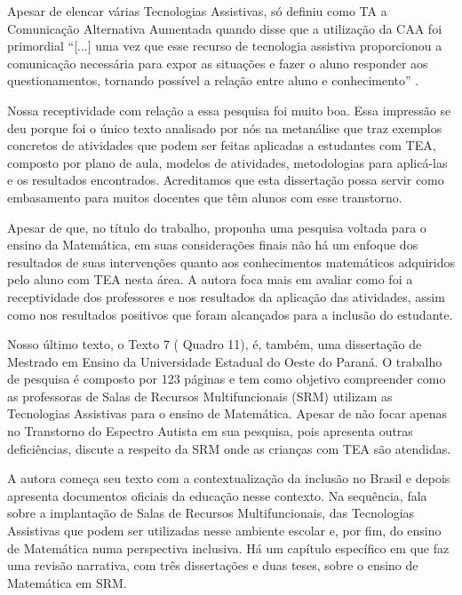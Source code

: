 \documentclass[portuguese]{textolivre}
\begin{document}
Apesar de elencar várias Tecnologias Assistivas, \textcite{camargo2020} só
definiu como TA a Comunicação Alternativa Aumentada quando disse que a
utilização da CAA foi primordial ``{[}...{]} uma vez que esse recurso de
tecnologia assistiva proporcionou a comunicação necessária para expor as
situações e fazer o aluno responder aos questionamentos, tornando
possível a relação entre aluno e conhecimento''
\cite[p.~80]{camargo2020}.

Nossa receptividade com relação a essa pesquisa foi muito boa. Essa
impressão se deu porque foi o único texto analisado por nós na
metanálise que traz exemplos concretos de atividades que podem ser
feitas aplicadas a estudantes com TEA, composto por plano de aula,
modelos de atividades, metodologias para aplicá-las e os resultados
encontrados. Acreditamos que esta dissertação possa servir como
embasamento para muitos docentes que têm alunos com esse transtorno.

Apesar de que, no título do trabalho, \textcite{camargo2020} proponha uma
pesquisa voltada para o ensino da Matemática, em suas considerações
finais não há um enfoque dos resultados de suas intervenções quanto aos
conhecimentos matemáticos adquiridos pelo aluno com TEA nesta área. A
autora foca mais em avaliar como foi a receptividade dos professores e
nos resultados da aplicação das atividades, assim como nos resultados
positivos que foram alcançados para a inclusão do estudante.

Nosso último texto, o Texto 7 ( Quadro 11), é, também, uma dissertação de
Mestrado em Ensino da Universidade Estadual do Oeste do Paraná. O
trabalho de pesquisa é composto por 123 páginas e tem como objetivo
compreender como as professoras de Salas de Recursos Multifuncionais
(SRM) utilizam as Tecnologias Assistivas para o ensino de Matemática.
Apesar de não focar apenas no Transtorno do Espectro Autista em sua
pesquisa, pois apresenta outras deficiências, \textcite{gubert2022} discute a
respeito da SRM onde as crianças com TEA são atendidas.

A autora começa seu texto com a contextualização da inclusão no Brasil e
depois apresenta documentos oficiais da educação nesse contexto. Na
sequência, fala sobre a implantação de Salas de Recursos
Multifuncionais, das Tecnologias Assistivas que podem ser utilizadas
nesse ambiente escolar e, por fim, do ensino de Matemática numa
perspectiva inclusiva. Há um capítulo específico em que \textcite{gubert2022}
faz uma revisão narrativa, com três dissertações e duas teses, sobre o
ensino de Matemática em SRM.
\end{document}
